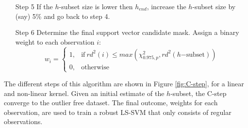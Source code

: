 \documentclass[preprint,12pt]{elsarticle}
\begin{document}
\begin{itemize}
		
		\item [Step 5] If the $h$-subset size is lower then $h_{end}$, increase the $h$-subset size by (say) 5\% and go back to step 4. 
		\item [Step 6] Determine the final support vector candidate mask. Assign a binary weight to each observation $i$:
		\begin{equation}
		w_i =
		\begin{cases}
		1, & \text{if}\ rd^2(i) \leq max(\chi^2_{0.975, p}, rd^2(h\mathrm{-subset})) \\
		0, & \text{otherwise}
		\end{cases}
		\end{equation}
	\end{itemize}
	The different steps of this algorithm are shown in Figure \ref{fig:C-step}, for a linear and non-linear kernel. Given an initial estimate of the $h$-subset, the C-step converge to the outlier free dataset. The final outcome, weights for each observation, are used to train a robust LS-SVM that only consists of regular observations.
	
\end{document}
